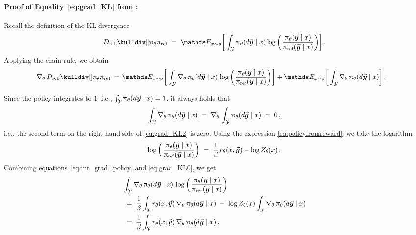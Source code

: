 		
		
		\paragraph{Proof of Equality~\eqref{eq:grad_KL} from :}
		
		Recall the definition of the KL divergence
		\begin{align*}
			\kull{\policytheta}{\policyref}
			\; = \; \Exp_{\prompt \sim \promptdistr} 
			\bigg[ \int_{\ResponseSp} \policytheta(\diff \response \mid \prompt)
			\log \bigg( \frac{\policytheta(\response \mid \prompt)}{\policyref(\response \mid \prompt)} \bigg) \bigg] \, .
		\end{align*}
		Applying the chain rule, we obtain
		\begin{align}
			\gradtheta \kull{\policytheta}{\policyref}
			& \, = \, \Exp_{\prompt \sim \promptdistr}  \bigg[ \int_{\ResponseSp} \gradtheta \policytheta(\diff \response \mid \prompt) \,
			\log \bigg( \frac{\policytheta(\response \mid \prompt)}{\policyref(\response \mid \prompt)}\bigg) \bigg]  
			\label{eq:grad_KL2}
			+ \Exp_{\prompt \sim \promptdistr}  \bigg[ \int_{\ResponseSp} 
			\gradtheta \policytheta(\diff \response \mid \prompt) \bigg] \, .
		\end{align}
		
		Since the policy integrates to $1$, i.e., $\int_{\mathcal{Y}} 
		\uppi_{\theta}({d } \vec{\boldsymbol{y}}\!\, \mid x) = 1$, it always holds that
		\begin{align}
			\label{eq:int_grad_policy}
			\int_{\mathcal{Y}} 
			\nabla_{\theta} \,  \uppi_{\theta}({d } \vec{\boldsymbol{y}}\!\, \mid x)
			\; = \; \nabla_{\theta} \,  \int_{\mathcal{Y}} 
			\uppi_{\theta}({d } \vec{\boldsymbol{y}}\!\, \mid x)
			\; = \; 0 \, ,
		\end{align}
		i.e., the second term on the right-hand side of \eqref{eq:grad_KL2} is zero.
		Using the expression \eqref{eq:policyfromreward}, we take the logarithm
		\begin{align}
			\label{eq:grad_KL0}
			\log \bigg( \frac{\uppi_{\theta}(\vec{\boldsymbol{y}}\!\, \mid x)}{\uppi_{{\rm ref}}(\vec{\boldsymbol{y}}\!\, \mid x)} \bigg)
			\; = \; \frac{1}{\beta} \, r_{\theta}(x, \vec{\boldsymbol{y}}\!\,) - \log Z_{\theta} (x) \, .
		\end{align}
		Combining equations~\eqref{eq:int_grad_policy} and \eqref{eq:grad_KL0}, we get
		\begin{align}
			& \int_{\ResponseSp} \gradtheta \policytheta(\diff \response \mid \prompt) \,
			\log \bigg( \frac{\policytheta(\response \mid \prompt)}{\policyref(\response \mid \prompt)}\bigg)  \notag  \\
			& \; = \; \frac{1}{\parabeta} \int_{\ResponseSp} \rewardtheta(\prompt, \response) \, \gradtheta \policytheta(\diff \response \mid \prompt) \; - \; \log \Partitiontheta(\prompt) \int_{\ResponseSp} \gradtheta \policytheta(\diff \response \mid \prompt)  \notag  \\
			\label{eq:grad_KL1}
			& \; = \; \frac{1}{\parabeta} \int_{\ResponseSp} \rewardtheta(\prompt, \response) \, \gradtheta \policytheta(\diff \response \mid \prompt) \, .
		\end{align}
		
